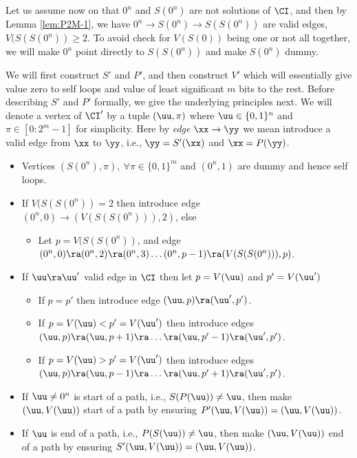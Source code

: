 Let us assume now on that $0^n$ and $S(0^n)$ are not solutions of $\CI$, and then by Lemma \ref{lem:P2M-1}, we have $0^n \rightarrow S(0^n) \rightarrow S(S(0^n))$ are valid edges, $V(S(S(0^n))\ge 2$. To avoid check for $V(S(0))$ being one or not all together, we will make $0^n$ point directly to $S(S(0^n))$ and make $S(0^n)$ dummy. 

We will first construct $S'$ and $P'$, and then construct $V'$ which will essentially give value zero to self loops and value of least significant $m$ bits to the rest. 
Before describing $S'$ and $P'$ formally, we give the underlying principles next. 
We will denote a vertex of $\CI'$ by a tuple $(\uu,\pi)$ where $\uu \in \{0,1\}^n$ and $\pi\in [0:2^m-1]$ for simplicity. 
Here by {\em edge $\xx\rightarrow \yy$} we mean introduce a valid edge from $\xx$ to $\yy$, i.e., $\yy=S'(\xx)$ and $\xx=P(\yy)$. 
\begin{itemize}
\item Vertices $(S(0^n),\pi),\ \forall \pi \in \{0,1\}^m$ and $(0^n,1)$ are dummy and hence self loops.
\item If $V(S(S(0^n))=2$ then introduce edge $(0^n,0)\rightarrow (V(S(S(0^n))),2)$, else 
\begin{itemize}
\item Let $p=V(S(S(0^n))$, and edge $(0^n,0)\ra (0^n,2)\ra (0^n, 3)\dots (0^n,p-1)\ra (V(S(S(0^n))),p)$.
\end{itemize}
\item If $\uu \ra \uu'$ valid edge in $\CI$ then let $p=V(\uu)$ and $p'=V(\uu')$
\begin{itemize}
\item If $p=p'$ then introduce edge $(\uu,p)\ra (\uu',p')$. %
\item If $p=V(\uu)<p'=V(\uu')$ then introduce edges $(\uu,p)\ra (\uu,p+1)\ra \dots\ra (\uu,p'-1)\ra (\uu',p')$.
\item If $p=V(\uu)>p'=V(\uu')$ then introduce edges $(\uu,p)\ra (\uu,p-1)\ra \dots\ra (\uu,p'+1)\ra (\uu',p')$.
\end{itemize}
\item If $\uu\neq 0^n$ is start of a path, i.e., $S(P(\uu))\neq \uu$, then make $(\uu,V(\uu))$ start of a path by ensuring $P'(\uu,V(\uu))=(\uu,V(\uu))$.
\item If $\uu$ is end of a path, i.e., $P(S(\uu))\neq \uu$, then make $(\uu,V(\uu))$ end of a path by ensuring $S'(\uu,V(\uu))=(\uu,V(\uu))$.
\end{itemize}

